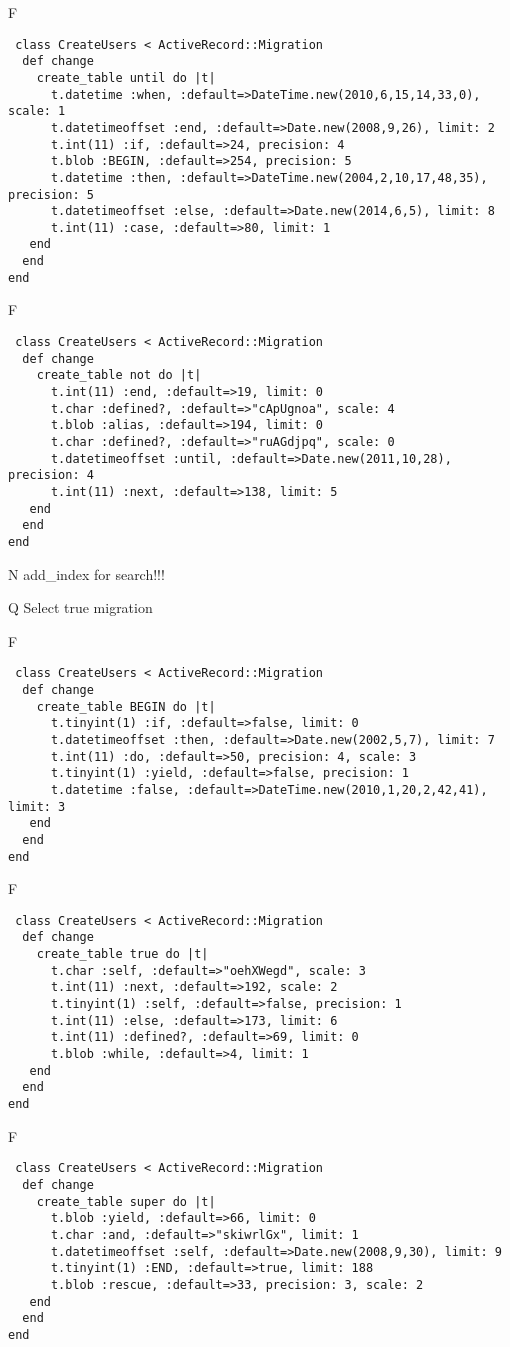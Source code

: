 F
\begin{verbatim}
 class CreateUsers < ActiveRecord::Migration 
  def change 
    create_table until do |t| 
      t.datetime :when, :default=>DateTime.new(2010,6,15,14,33,0), scale: 1
      t.datetimeoffset :end, :default=>Date.new(2008,9,26), limit: 2
      t.int(11) :if, :default=>24, precision: 4
      t.blob :BEGIN, :default=>254, precision: 5
      t.datetime :then, :default=>DateTime.new(2004,2,10,17,48,35), precision: 5
      t.datetimeoffset :else, :default=>Date.new(2014,6,5), limit: 8
      t.int(11) :case, :default=>80, limit: 1
   end 
  end 
end
\end{verbatim}

F
\begin{verbatim}
 class CreateUsers < ActiveRecord::Migration 
  def change 
    create_table not do |t| 
      t.int(11) :end, :default=>19, limit: 0
      t.char :defined?, :default=>"cApUgnoa", scale: 4
      t.blob :alias, :default=>194, limit: 0
      t.char :defined?, :default=>"ruAGdjpq", scale: 0
      t.datetimeoffset :until, :default=>Date.new(2011,10,28), precision: 4
      t.int(11) :next, :default=>138, limit: 5
   end 
  end 
end
\end{verbatim}
N
add_index for search!!!
  
Q
Select true migration

F
\begin{verbatim}
 class CreateUsers < ActiveRecord::Migration 
  def change 
    create_table BEGIN do |t| 
      t.tinyint(1) :if, :default=>false, limit: 0
      t.datetimeoffset :then, :default=>Date.new(2002,5,7), limit: 7
      t.int(11) :do, :default=>50, precision: 4, scale: 3
      t.tinyint(1) :yield, :default=>false, precision: 1
      t.datetime :false, :default=>DateTime.new(2010,1,20,2,42,41), limit: 3
   end 
  end 
end
\end{verbatim}

F
\begin{verbatim}
 class CreateUsers < ActiveRecord::Migration 
  def change 
    create_table true do |t| 
      t.char :self, :default=>"oehXWegd", scale: 3
      t.int(11) :next, :default=>192, scale: 2
      t.tinyint(1) :self, :default=>false, precision: 1
      t.int(11) :else, :default=>173, limit: 6
      t.int(11) :defined?, :default=>69, limit: 0
      t.blob :while, :default=>4, limit: 1
   end 
  end 
end
\end{verbatim}

F
\begin{verbatim}
 class CreateUsers < ActiveRecord::Migration 
  def change 
    create_table super do |t| 
      t.blob :yield, :default=>66, limit: 0
      t.char :and, :default=>"skiwrlGx", limit: 1
      t.datetimeoffset :self, :default=>Date.new(2008,9,30), limit: 9
      t.tinyint(1) :END, :default=>true, limit: 188
      t.blob :rescue, :default=>33, precision: 3, scale: 2
   end 
  end 
end
\end{verbatim}

